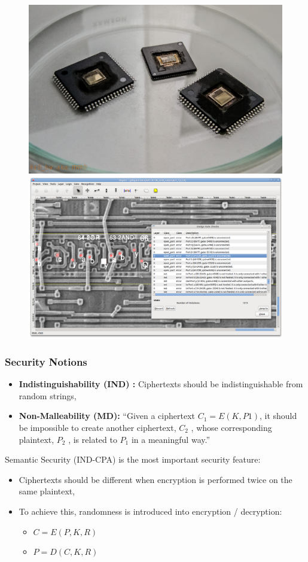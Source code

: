 \documentclass{beamer}
\begin{document}
\begin{frame}[allowframebreaks]
                \begin{figure}[h!]
                  \includegraphics[width=.49\textwidth]{./decaping.jpg}%
                  \hfill
                  \includegraphics[width=.49\textwidth]{./degate.png}
                \end{figure}

\end{frame}

\begin{frame}
        \frametitle{Security Notions}

        \begin{itemize}
          \item {\bf Indistinguishability (IND) :} Ciphertexts should be
            indistinguishable from random strings,

          \item {\bf Non-Malleability (MD):} ``Given a ciphertext $C_1 = E(K, P 1)$,
it should be impossible to create another ciphertext, $C_2$ , whose corresponding
plaintext, $P_2$ , is related to $P_1$ in a meaningful way.''

        \end{itemize}

        \vspace{1 mm}

        Semantic Security (IND-CPA) is the most important security feature:
        \begin{itemize}
          \item Ciphertexts should be different when encryption is performed
            twice on the same plaintext,
          \item To achieve this, randomness is introduced into encryption /
            decryption: 

        \begin{itemize}
          \item $C = E(P, K, R)$
          \item $P = D(C, K, R)$
        \end{itemize}

        \end{itemize}
       \end{frame}
\end{document}
